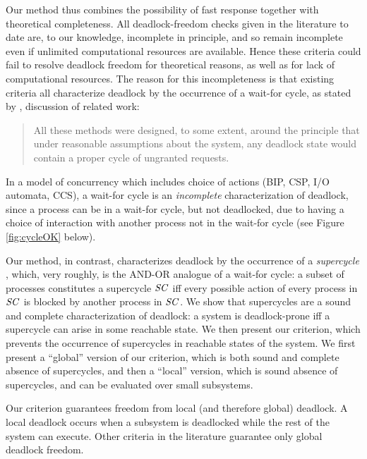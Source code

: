 Our method thus combines the possibility of fast response together with theoretical completeness.
All deadlock-freedom checks given in the literature to date are, to our knowledge, incomplete in
principle, and so remain incomplete even if unlimited computational resources are available.
Hence these criteria could fail to resolve deadlock freedom for theoretical reasons, as well as for 
lack of computational resources.
%
The reason for this incompleteness is that existing criteria all characterize deadlock by the
occurrence of a wait-for cycle, \eg as stated by , discussion of related
work:
\begin{quote}
All these methods were designed, to some extent, around the principle that under reasonable
assumptions about the system, any deadlock state would contain a proper cycle of ungranted requests.
\end{quote}
In a model of concurrency which includes choice of actions
(\eg BIP, CSP, I/O automata, CCS), a wait-for cycle is an \emph{incomplete} characterization of
deadlock, since a process can be in a wait-for cycle, but not deadlocked, due to having a choice of
interaction with another process not in the wait-for cycle (see Figure
\ref{fig:cycleOK} below).

Our method, in contrast, characterizes deadlock by the occurrence of a \emph{supercycle} \cite{AE98,AC05}, which, very roughly, is the AND-OR analogue
of a wait-for cycle: a subset of processes constitutes a supercycle $\mathit{SC}$ iff every possible action of every process in $\mathit{SC}$ is blocked by another
process in $\mathit{SC}$.
%
We show that supercycles are a sound and complete characterization of deadlock: a system is deadlock-prone iff a supercycle can arise in some
reachable state.
%
We then present our criterion, which prevents the occurrence of supercycles in reachable states of
the system. We first present a ``global'' version of our criterion, which is both sound and complete
\wrt absence of supercycles, and then a ``local'' version, which is sound \wrt absence of
supercycles, and can be evaluated over small subsystems.

Our criterion guarantees freedom from local (and therefore global) deadlock. A local deadlock occurs when 
a subsystem is deadlocked while the rest of the system can execute. Other criteria in the literature \cite{AGR16,Ma96,RD87,DFinder2,BR91,MM12,GS03,AB03} guarantee only global deadlock freedom.

